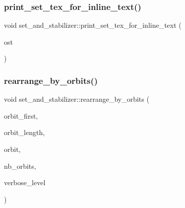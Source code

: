 \mbox{\label{classset__and__stabilizer_abded22948be28aa60b8ef9942d7b8198}} 
\subsubsection{\texorpdfstring{print\+\_\+set\+\_\+tex\+\_\+for\+\_\+inline\+\_\+text()}{print\_set\_tex\_for\_inline\_text()}}
{\footnotesize\ttfamily void set\+\_\+and\+\_\+stabilizer\+::print\+\_\+set\+\_\+tex\+\_\+for\+\_\+inline\+\_\+text (\begin{DoxyParamCaption}\item[{ostream \&}]{ost }\end{DoxyParamCaption})}

\mbox{\label{classset__and__stabilizer_acfc35aa1163712215848fab02017b28d}} 
\subsubsection{\texorpdfstring{rearrange\+\_\+by\+\_\+orbits()}{rearrange\_by\_orbits()}}
{\footnotesize\ttfamily void set\+\_\+and\+\_\+stabilizer\+::rearrange\+\_\+by\+\_\+orbits (\begin{DoxyParamCaption}\item[{\mbox{\hyperlink{galois_8h_a09fddde158a3a20bd2dcadb609de11dc}{I\+NT}} $\ast$\&}]{orbit\+\_\+first,  }\item[{\mbox{\hyperlink{galois_8h_a09fddde158a3a20bd2dcadb609de11dc}{I\+NT}} $\ast$\&}]{orbit\+\_\+length,  }\item[{\mbox{\hyperlink{galois_8h_a09fddde158a3a20bd2dcadb609de11dc}{I\+NT}} $\ast$\&}]{orbit,  }\item[{\mbox{\hyperlink{galois_8h_a09fddde158a3a20bd2dcadb609de11dc}{I\+NT}} \&}]{nb\+\_\+orbits,  }\item[{\mbox{\hyperlink{galois_8h_a09fddde158a3a20bd2dcadb609de11dc}{I\+NT}}}]{verbose\+\_\+level }\end{DoxyParamCaption})}


